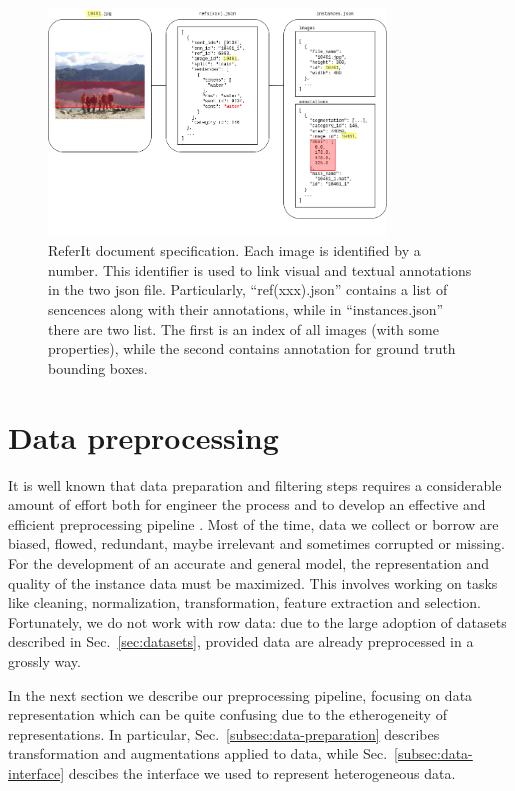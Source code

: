 \begin{figure}
  \centering
  \includegraphics[width=0.8\textwidth]{figures/referit-document-specification.png}
  \caption[ReferIt document specification]{ReferIt document
  specification. Each image is identified by a number. This identifier
  is used to link visual and textual annotations in the two json file.
  Particularly, ``ref(xxx).json'' contains a list of sencences along
  with their annotations, while in ``instances.json'' there are two
  list. The first is an index of all images (with some properties),
  while the second contains annotation for ground truth bounding
  boxes. }
  \label{fig:referit-technical-data-representation}
\end{figure}

\section{Data preprocessing}

It is well known that data preparation and filtering steps requires a
considerable amount of effort both for engineer the process and to
develop an effective and efficient preprocessing pipeline
\cite{kotsiantis2006data}. Most of the time, data we collect or borrow
are biased, flowed, redundant, maybe irrelevant and sometimes
corrupted or missing. For the development of an accurate and general
model, the representation and quality of the instance data must be
maximized. This involves working on tasks like cleaning,
normalization, transformation, feature extraction and selection.
Fortunately, we do not work with row data: due to the large adoption
of datasets described in Sec.~\ref{sec:datasets}, provided data are
already preprocessed in a grossly way.

In the next section we describe our preprocessing pipeline, focusing
on data representation which can be quite confusing due to the
etherogeneity of representations. In particular,
Sec.~\ref{subsec:data-preparation} describes transformation and
augmentations applied to data, while Sec.~\ref{subsec:data-interface}
descibes the interface we used to represent heterogeneous data.

